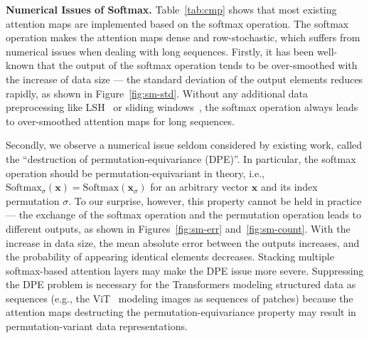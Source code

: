 \textbf{Numerical Issues of Softmax.} 
Table~\ref{tab:cmp} shows that most existing attention maps are implemented based on the softmax operation. 
The softmax operation makes the attention maps dense and row-stochastic, which suffers from numerical issues when dealing with long sequences. 
Firstly, it has been well-known that the output of the softmax operation tends to be over-smoothed with the increase of data size --- the standard deviation of the output elements reduces rapidly, as shown in Figure~\ref{fig:sm-std}.
Without any additional data preprocessing like LSH~\cite{kitaev2020reformer} or sliding windows~\cite{beltagy2020longformer,child2019generating}, the softmax operation always leads to over-smoothed attention maps for long sequences. 

Secondly, we observe a numerical issue seldom considered by existing work, called the ``destruction of permutation-equivariance (DPE)''. 
In particular, the softmax operation should be permutation-equivariant in theory, i.e., $\text{Softmax}_{\sigma}(\bm{x})=\text{Softmax}(\bm{x}_{\sigma})$ for an arbitrary vector $\bm{x}$ and its index permutation $\sigma$. 
To our surprise, however, this property cannot be held in practice --- the exchange of the softmax operation and the permutation operation leads to different outputs, as shown in Figures~\ref{fig:sm-err} and~\ref{fig:sm-count}. 
With the increase in data size, the mean absolute error between the outputs increases, and the probability of appearing identical elements decreases. 
Stacking multiple softmax-based attention layers may make the DPE issue more severe.
Suppressing the DPE problem is necessary for the Transformers modeling structured data as sequences (e.g., the ViT~\cite{dosovitskiy2021an} modeling images as sequences of patches) because the attention maps destructing the permutation-equivariance property may result in permutation-variant data representations.

